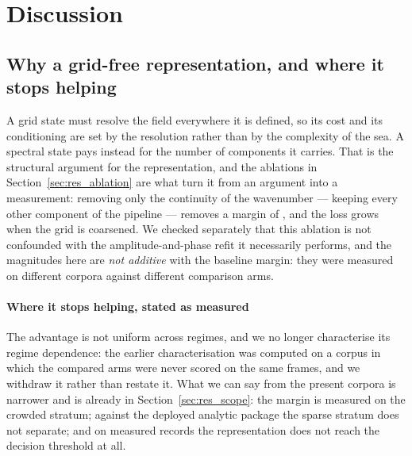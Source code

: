 \documentclass[review]{elsarticle}
\begin{document}
\section{Discussion}
\label{sec:discussion}

\subsection{Why a grid-free representation, and where it stops helping}
\label{sec:disc_gridfree}


A grid state must resolve the field everywhere it is defined, so its cost and its
conditioning are set by the resolution rather than by the complexity of the sea.
A spectral state pays instead for the number of components it carries. That is the
structural argument for the representation, and the ablations in
Section~\ref{sec:res_ablation} are what turn it from an argument into a measurement:
removing only the continuity of the wavenumber --- keeping every other component of
the pipeline --- removes a margin of \BSixteenRel{}, and the loss grows when the grid is coarsened.
We checked separately that this ablation is not confounded with the
amplitude-and-phase refit it necessarily performs, and the magnitudes here are
\emph{not additive} with the baseline margin: they were measured on different
corpora against different comparison arms.

\paragraph{Where it stops helping, stated as measured}
The advantage is not uniform across regimes, and we no longer characterise its
regime dependence: the earlier characterisation was computed on a corpus in which
the compared arms were never scored on the same frames, and we withdraw it rather
than restate it. What we can say from the present corpora is narrower and is already
in Section~\ref{sec:res_scope}: the margin is measured on the crowded stratum;
against the deployed analytic package the sparse stratum does not separate; and on
measured records the representation does not reach the decision threshold at all.
\end{document}
